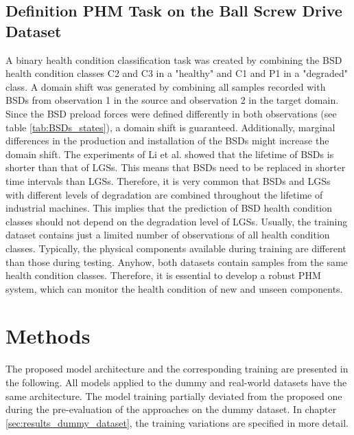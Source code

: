 \subsection{Definition PHM Task on the Ball Screw Drive Dataset}
A binary health condition classification task was created by combining the BSD health condition classes C2 and C3 in a "healthy" and C1 and P1 in a "degraded" class. A domain shift was generated by combining all samples recorded with BSDs from observation 1 in the source and observation 2 in the target domain. Since the BSD preload forces were defined differently in both observations (see table \ref{tab:BSDs_states}), a domain shift is guaranteed. Additionally, marginal differences in the production and installation of the BSDs might increase the domain shift. The experiments of Li et al. \cite{Li2018} showed that the lifetime of BSDs is shorter than that of LGSs. This means that BSDs need to be replaced in shorter time intervals than LGSs. Therefore, it is very common that BSDs and LGSs with different levels of degradation are combined throughout the lifetime of industrial machines. This implies that the prediction of BSD health condition classes should not depend on the degradation level of LGSs. Usually, the training dataset contains just a limited number of observations of all health condition classes. Typically, the physical components available during training are different than those during testing. Anyhow, both datasets contain samples from the same health condition classes. Therefore, it is essential to develop a robust PHM system, which can monitor the health condition of new and unseen components.

\section{Methods}\label{chapter:introduction}
The proposed model architecture and the corresponding training are presented in the following. All models applied to the dummy and real-world datasets have the same architecture. The model training partially deviated from the proposed one during the pre-evaluation of the approaches on the dummy dataset. In chapter \ref{sec:results_dummy_dataset}, the training variations are specified in more detail. 

